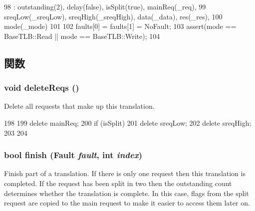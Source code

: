 \begin{DoxyCode}
98         : outstanding(2), delay(false), isSplit(true), mainReq(_req),
99           sreqLow(_sreqLow), sreqHigh(_sreqHigh), data(_data), res(_res),
100           mode(_mode)
101     {
102         faults[0] = faults[1] = NoFault;
103         assert(mode == BaseTLB::Read || mode == BaseTLB::Write);
104     }
\end{DoxyCode}


\subsection{関数}
\hypertarget{classWholeTranslationState_a6dc2cbc61a85f942f081c1a136dd3585}{
\subsubsection[{deleteReqs}]{\setlength{\rightskip}{0pt plus 5cm}void deleteReqs ()}}
\label{classWholeTranslationState_a6dc2cbc61a85f942f081c1a136dd3585}
Delete all requests that make up this translation. 


\begin{DoxyCode}
198     {
199         delete mainReq;
200         if (isSplit) {
201             delete sreqLow;
202             delete sreqHigh;
203         }
204     }
\end{DoxyCode}
\hypertarget{classWholeTranslationState_a4d0ff87d4723870a1348d1f62d15d785}{
\subsubsection[{finish}]{\setlength{\rightskip}{0pt plus 5cm}bool finish ({\bf Fault} {\em fault}, \/  int {\em index})}}
\label{classWholeTranslationState_a4d0ff87d4723870a1348d1f62d15d785}
Finish part of a translation. If there is only one request then this translation is completed. If the request has been split in two then the outstanding count determines whether the translation is complete. In this case, flags from the split request are copied to the main request to make it easier to access them later on. 


